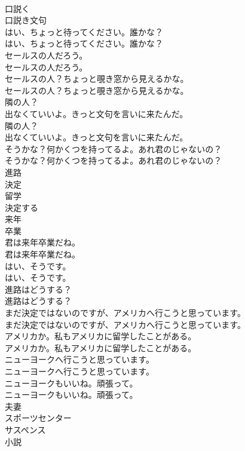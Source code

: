 \documentclass[8pt]{extreport}
\begin{document}
\begin{CJK}{UTF8}{min}
\\	口説く
\\	口説き文句
\\	はい、ちょっと待ってください。誰かな？	
\\	はい、ちょっと待ってください。誰かな？ 
\\	セールスの人だろう。	
\\	セールスの人だろう。 
\\	セールスの人？ちょっと覗き窓から見えるかな。	
\\	セールスの人？ちょっと覗き窓から見えるかな。 
\\	隣の人？
\\	出なくていいよ。きっと文句を言いに来たんだ。	
\\	隣の人？
\\	出なくていいよ。きっと文句を言いに来たんだ。 
\\	そうかな？何かくつを持ってるよ。あれ君のじゃないの？	
\\	そうかな？何かくつを持ってるよ。あれ君のじゃないの？ 
\\	進路
\\	決定
\\	留学
\\	決定する
\\	来年
\\	卒業
\\	君は来年卒業だね。	
\\	君は来年卒業だね。 
\\	はい、そうです。	
\\	はい、そうです。 
\\	進路はどうする？	
\\	進路はどうする？ 
\\	まだ決定ではないのですが、アメリカへ行こうと思っています。	
\\	まだ決定ではないのですが、アメリカへ行こうと思っています。 
\\	アメリカか。私もアメリカに留学したことがある。	
\\	アメリカか。私もアメリカに留学したことがある。 
\\	ニューヨークへ行こうと思っています。	
\\	ニューヨークへ行こうと思っています。 
\\	ニューヨークもいいね。頑張って。	
\\	ニューヨークもいいね。頑張って。 
\\	夫妻
\\	スポーツセンター
\\	サスペンス
\\	小説

\end{CJK}
\end{document}
